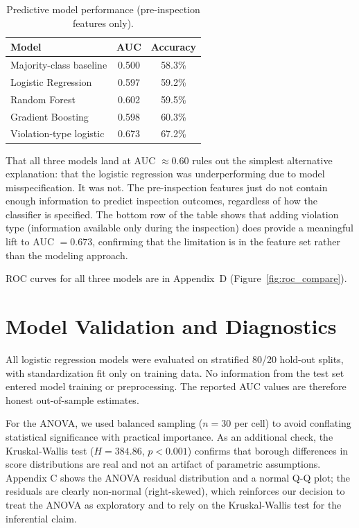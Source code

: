 \documentclass[11pt, twocolumn]{article}
\begin{document}
\begin{table}[h]
  \centering
  \small
  \caption{Predictive model performance (pre-inspection features only).}
  \label{tab:models}
  \begin{tabular}{lcc}
    \toprule
    Model & AUC & Accuracy \\
    \midrule
    Majority-class baseline & 0.500 & 58.3\% \\
    Logistic Regression     & 0.597 & 59.2\% \\
    Random Forest           & 0.602 & 59.5\% \\
    Gradient Boosting       & 0.598 & 60.3\% \\
    \midrule
    Violation-type logistic & 0.673 & 67.2\% \\
    \bottomrule
  \end{tabular}
\end{table}

That all three models land at AUC $\approx 0.60$ rules out the simplest
alternative explanation: that the logistic regression was underperforming
due to model misspecification. It was not. The pre-inspection features
just do not contain enough information to predict inspection outcomes,
regardless of how the classifier is specified. The bottom row of the table shows that
adding violation type (information available only during the inspection)
does provide a meaningful lift to AUC $= 0.673$, confirming that the
limitation is in the feature set rather than the modeling approach.

ROC curves for all three models are in Appendix~D
(Figure~\ref{fig:roc_compare}).

\section{Model Validation and Diagnostics}

All logistic regression models were evaluated on stratified 80/20
hold-out splits, with standardization fit only on training data. No
information from the test set entered model training or preprocessing.
The reported AUC values are therefore honest out-of-sample estimates.

For the ANOVA, we used balanced sampling ($n = 30$ per cell) to avoid
conflating statistical significance with practical importance. As an
additional check, the Kruskal-Wallis test ($H = 384.86$, $p < 0.001$)
confirms that borough differences in score distributions are real and
not an artifact of parametric assumptions. Appendix C shows the ANOVA
residual distribution and a normal Q-Q plot; the residuals are clearly
non-normal (right-skewed), which reinforces our decision to treat the
ANOVA as exploratory and to rely on the Kruskal-Wallis test for the
inferential claim.
\end{document}
